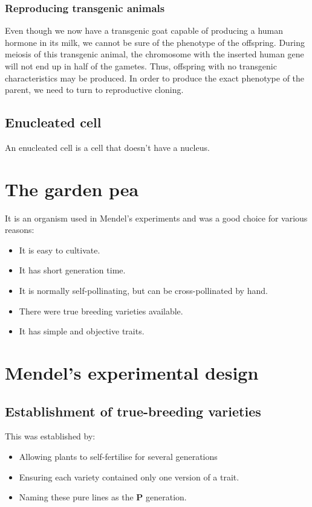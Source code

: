 \documentclass[11pt]{article}
\begin{document}
\subsubsection{Reproducing transgenic animals}
\label{sec:org93a551b}
Even though we now have a transgenic goat capable of producing a human hormone in its milk, we cannot be sure of the phenotype of the offspring. During meiosis of this transgenic animal, the chromosome with the inserted human gene will not end up in half of the gametes. Thus, offspring with no transgenic characteristics may be produced. In order to produce the exact phenotype of the parent, we need to turn to reproductive cloning.

\subsection{Enucleated cell}
\label{sec:org759da0f}
An enucleated cell is a cell that doesn't have a nucleus.

\newpage

\section{The garden pea}
\label{sec:orgcfe3ed1}
It is an organism used in Mendel's experiments and was a good choice for various reasons:
\begin{itemize}
\item It is easy to cultivate.
\item It has short generation time.
\item It is normally self-pollinating, but can be cross-pollinated by hand.
\item There were true breeding varieties available.
\item It has simple and objective traits.
\end{itemize}


\section{Mendel's experimental design}
\label{sec:org7581f12}

\subsection{Establishment of true-breeding varieties}
\label{sec:org1c473d6}
This was established by:
\begin{itemize}
\item Allowing plants to self-fertilise for several generations
\item Ensuring each variety contained only one version of a trait.
\item Naming these pure lines as the \textbf{P} generation.
\end{itemize}
\end{document}
